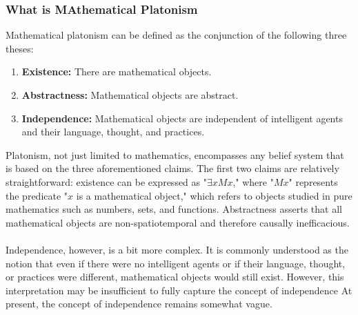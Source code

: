 \documentclass[10pt,a4paper]{article}
\begin{document}
                    \subsubsection{What is MAthematical Platonism}
                        Mathematical platonism can be defined as the conjunction of the following three theses:
                        \begin{enumerate}
                            \item  \textbf{Existence: }There are mathematical objects.
                            \item  \textbf{Abstractness:} Mathematical objects are abstract.
                            \item  \textbf{Independence:} Mathematical objects are independent of intelligent agents and their language, thought, and practices.
                        \end{enumerate}
                        Platonism, not just limited to mathematics, encompasses any belief system that is based on the three aforementioned claims. The first two claims are relatively straightforward: existence can be expressed as "$\exists xMx$," where "$Mx$" represents the predicate "$x$ is a mathematical object," which refers to objects studied in pure mathematics such as numbers, sets, and functions. Abstractness asserts that all mathematical objects are non-spatiotemporal and therefore causally inefficacious. 
                        \\
                        \\
                        Independence, however, is a bit more complex. It is commonly understood as the notion that even if there were no intelligent agents or if their language, thought, or practices were different, mathematical objects would still exist. However, this interpretation may be insufficient to fully capture the concept of independence At present, the concept of independence remains somewhat vague.
\end{document}
